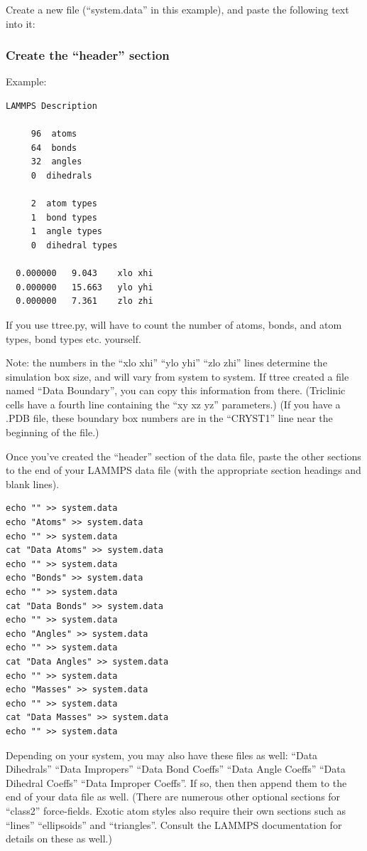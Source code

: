 \documentclass[11pt]{article}
\begin{document}
Create a new file (``system.data'' in this example), 
and paste the following text into it:

\subsubsection*{Create the ``header'' section}
Example:
\begin{verbatim}
LAMMPS Description

     96  atoms
     64  bonds
     32  angles
     0  dihedrals

     2  atom types
     1  bond types
     1  angle types
     0  dihedral types

  0.000000   9.043    xlo xhi
  0.000000   15.663   ylo yhi
  0.000000   7.361    zlo zhi
\end{verbatim}
If you use ttree.py, will have to count the number of 
atoms, bonds, and atom types, bond types etc. yourself.

Note: the numbers in the ``xlo xhi''  ``ylo yhi'' ``zlo zhi'' lines determine the 
simulation box size, and will vary from system to system.
If ttree created a file named ``Data Boundary'', you can copy this information from there.
(Triclinic cells have a fourth line containing the ``xy xz yz'' parameters.)
(If you have a .PDB file, these boundary box numbers are in the ``CRYST1'' 
line near the beginning of the file.)


Once you've created the ``header'' section of the data file, 
paste the other sections to the end of your  LAMMPS data file
(with the appropriate section headings and blank lines).
\begin{verbatim}
echo "" >> system.data
echo "Atoms" >> system.data
echo "" >> system.data
cat "Data Atoms" >> system.data
echo "" >> system.data
echo "Bonds" >> system.data
echo "" >> system.data
cat "Data Bonds" >> system.data
echo "" >> system.data
echo "Angles" >> system.data
echo "" >> system.data
cat "Data Angles" >> system.data
echo "" >> system.data
echo "Masses" >> system.data
echo "" >> system.data
cat "Data Masses" >> system.data
echo "" >> system.data
\end{verbatim}

Depending on your system, you may also have these files as well:
``Data Dihedrals''
``Data Impropers''
``Data Bond Coeffs''
``Data Angle Coeffs''
``Data Dihedral Coeffs''
``Data Improper Coeffs''. 
If so, then then append them to the end of your data file as well.
(There are numerous other optional sections for ``class2'' force-fields.
 Exotic atom styles also require their own sections 
 such as ``lines'' ``ellipsoids'' and ``triangles''.
 Consult the LAMMPS documentation for details on these as well.)
\end{document}
